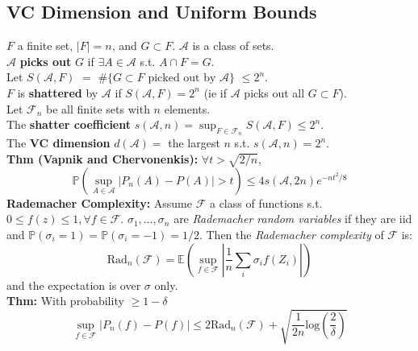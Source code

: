 \documentclass[10pt,twocolumn]{article}
\begin{document}
\subsection*{VC Dimension and Uniform Bounds}
    $F$ a finite set, $|F| = n$, and $G \subset F$. $\mathcal{A}$ is a class of sets.\\
    $\mathcal{A}$ \textbf{picks out} $G$ if $\exists A \in \mathcal{A}$ s.t. $A \cap F = G$.\\
    Let $S(\mathcal{A},F)$ $=$ $\#\{G \subset F \text{ picked out by } \mathcal{A}\}$ $\leq 2^{n}$.\\
    $F$ is \textbf{shattered} by $\mathcal{A}$ if $S(\mathcal{A},F) = 2^{n}$ (ie if $\mathcal{A}$ picks out all $G \subset F$).\\
    Let $\mathcal{F}_{n}$ be all finite sets with $n$ elements.\\
    The \textbf{shatter coefficient} $s(\mathcal{A},n) = \sup_{F \in \mathcal{F}_{n}} S(\mathcal{A},F) \leq 2^{n}$.\\
    The \textbf{VC dimension} $d(\mathcal{A}) =$ the largest $n$ s.t. $s(\mathcal{A},n) = 2^{n}$.\\
    \textbf{Thm (Vapnik and Chervonenkis):} $\forall t>\sqrt{2/n}$, 
    \begin{equation}
        \mathbb{P} \left( \sup_{A \in \mathcal{A}} |P_{n}(A) - P(A)| > t \right) \leq 4 s(\mathcal{A},2n)e^{-nt^{2}/8}
    \end{equation}
    \textbf{Rademacher Complexity:} Assume $\mathcal{F}$ a class of functions s.t. $0 \leq f(z) \leq 1, \forall f \in \mathcal{F}$.
    $\sigma_1,\ldots,\sigma_n$ are \emph{Rademacher random variables} if they are iid and $\mathbb{P}(\sigma_i=1) = \mathbb{P}(\sigma_i=-1) = 1/2$.
    Then the \emph{Rademacher complexity} of $\mathcal{F}$ is:
    \begin{equation}
        \text{Rad}_n(\mathcal{F}) = \mathbb{E} \left( \sup_{f \in \mathcal{F}} \left| \frac{1}{n} \sum_i \sigma_i f(Z_i)  \right|  \right)
    \end{equation}
    and the expectation is over $\sigma$ only.\\
    \textbf{Thm:} With probability $\geq 1-\delta$
    \begin{equation}
        \sup_{f \in \mathcal{F}} \left| P_n(f) - P(f)  \right|
            \leq 2\text{Rad}_n(\mathcal{F}) + \sqrt{\frac{1}{2n} \text{log} \left( \frac{2}{\delta} \right)}
    \end{equation}
\end{document}
